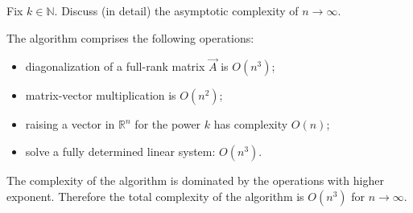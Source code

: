 \begin{problem}
\begin{subproblem}[2]
\end{subproblem}

\begin{subproblem}[1]
  Fix $k \in \mathbb{N}$. Discuss (in detail) the asymptotic complexity of
   $n\to\infty$.
 
 \begin{solution}
  The algorithm comprises the following operations:
  \begin{itemize}
   \item diagonalization of a full-rank matrix $\vec{A}$ is $O(n^3)$;
   \item matrix-vector multiplication is $O(n^2)$;
   \item raising a vector in $\mathbb{R}^n$ for the power $k$ has complexity $O(n)$;
   \item solve a fully determined linear system: $O(n^3)$.
  \end{itemize}
  The complexity of the algorithm is dominated by the operations with higher exponent. Therefore the total complexity of the algorithm is $O(n^3)$ for $n \rightarrow \infty$.
 \end{solution}
\end{subproblem}

\end{problem}
